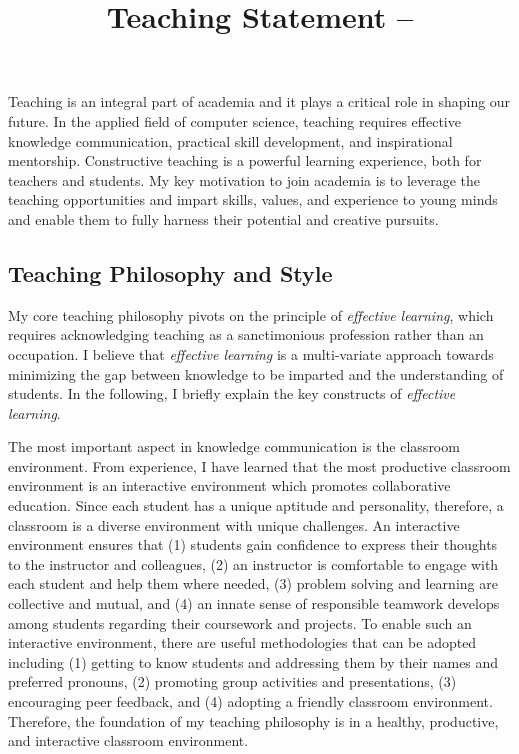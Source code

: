 \documentclass{NSF}
\begin{document}
\title{Teaching Statement -- }
\thispagestyle{empty}
Teaching is an integral part of academia and it plays a critical role in shaping our future. In the applied field of computer science, teaching requires effective knowledge communication, practical skill development, and inspirational mentorship.  Constructive teaching is a powerful learning experience, both for teachers and students. My key motivation to join academia is to leverage the teaching opportunities and impart skills, values, and experience to young minds and enable them to fully harness their potential and creative pursuits.  


\subsection*{Teaching Philosophy and Style}
My core teaching philosophy pivots on the principle of {\em effective learning}, which requires acknowledging teaching as a sanctimonious profession rather than an occupation. I believe that {\em effective learning} is a multi-variate approach towards minimizing the gap between knowledge to be imparted and the understanding of students. In the following, I briefly explain the key constructs of {\em effective learning}.

The most important aspect in knowledge communication is the classroom environment. From experience, I have learned that the most productive classroom environment is an interactive environment which promotes collaborative education. Since each student has a unique aptitude and personality, therefore, a classroom is a diverse environment with unique challenges. An interactive environment ensures that (1) students gain confidence to express their thoughts to the instructor and colleagues, (2) an instructor is comfortable to engage with each student and help them where needed, (3) problem solving and learning are collective and mutual, and (4) an innate sense of responsible teamwork develops among students regarding their coursework and projects. To enable such an interactive environment, there are useful methodologies that can be adopted including (1) getting to know students and addressing them by their names and preferred pronouns, (2) promoting group activities and presentations, (3) encouraging peer feedback, and (4) adopting a friendly classroom environment. Therefore, the foundation of my teaching philosophy is in a healthy, productive, and interactive classroom environment. 
\end{document}
